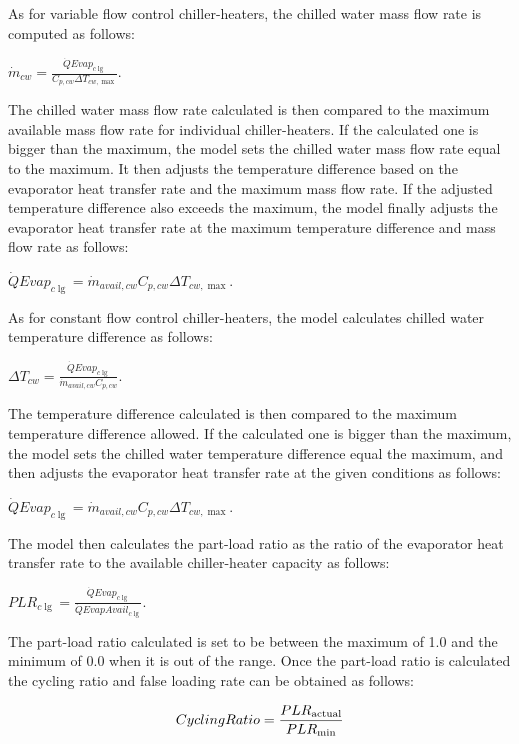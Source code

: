 As for variable flow control chiller-heaters, the chilled water mass flow rate is computed as follows:

\textbf{\emph{\({\dot m_{cw}} = \frac{{\dot QEva{p_{c\lg }}}}{{{C_{p,cw}}\Delta {T_{cw,\max }}}}\)}}.

The chilled water mass flow rate calculated is then compared to the maximum available mass flow rate for individual chiller-heaters. If the calculated one is bigger than the maximum, the model sets the chilled water mass flow rate equal to the maximum. It then adjusts the temperature difference based on the evaporator heat transfer rate and the maximum mass flow rate. If the adjusted temperature difference also exceeds the maximum, the model finally adjusts the evaporator heat transfer rate at the maximum temperature difference and mass flow rate as follows:

\textbf{\emph{\(\dot QEva{p_{c\lg }} = {\dot m_{avail,cw}}{C_{p,cw}}\Delta {T_{cw,\max }}\)}}.

As for constant flow control chiller-heaters, the model calculates chilled water temperature difference as follows:

\textbf{\emph{\(\Delta {T_{cw}} = \frac{{\dot QEva{p_{c\lg }}}}{{{{\dot m}_{avail,cw}}{C_{p,cw}}}}\)}}.

The temperature difference calculated is then compared to the maximum temperature difference allowed. If the calculated one is bigger than the maximum, the model sets the chilled water temperature difference equal the maximum, and then adjusts the evaporator heat transfer rate at the given conditions as follows:

\textbf{\emph{\(\dot QEva{p_{c\lg }} = {\dot m_{avail,cw}}{C_{p,cw}}\Delta {T_{cw,\max }}\)}}.

The model then calculates the part-load ratio as the ratio of the evaporator heat transfer rate to the available chiller-heater capacity as follows:

\textbf{\emph{\(PL{R_{c\lg }} = \frac{{\dot QEva{p_{c\lg }}}}{{\dot QEvapAvai{l_{c\lg }}}}\)}}.

The part-load ratio calculated is set to be between the maximum of 1.0 and the minimum of 0.0 when it is out of the range. Once the part-load ratio is calculated the cycling ratio and false loading rate can be obtained as follows:

\begin{equation}
CyclingRatio = \frac{{PL{R_{{\rm{actual}}}}}}{{PL{R_{{\rm{min}}}}}}
\end{equation}

